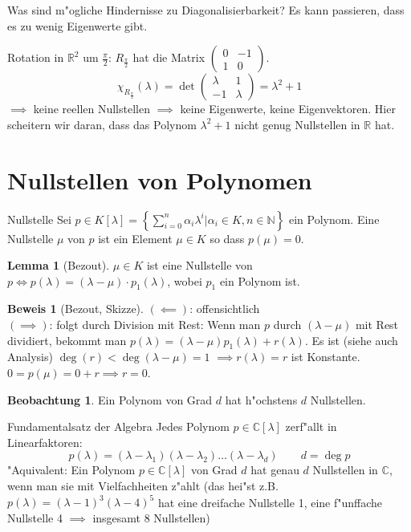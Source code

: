 \documentclass[oneside,fontsize=11pt,paper=a4,BCOR=0mm,DIV=12,automark,headsepline]{scrbook}
\newcommand{\gq}[1]{\glqq{}#1\grqq{}} %
\DeclareMathOperator{\mDeg}{deg}
\theoremstyle{remark}
\theoremstyle{definition}
\newtheorem{beobachtung}{Beobachtung}
\newtheorem{lemma}{Lemma}[section]
\theoremstyle{definition}
\newtheorem*{prof}{Beweis}
\theoremstyle{remark}
\begin{document}
Was sind m"ogliche Hindernisse zu Diagonalisierbarkeit?
Es kann passieren, dass es \gq{zu wenig} Eigenwerte gibt.
\begin{exa}[Rotation]
  Rotation in \(\mathbb{R}^2\) um \(\frac{\pi}{2}\): \(R_{\frac{\pi}{2}}\) hat die Matrix \(
  \begin{pmatrix}
    0 & -1 \\
    1 & 0
  \end{pmatrix}
  \).
  \[\chi_{R_{\frac{\pi}{2}}}(\lambda) = \det
    \begin{pmatrix}
      \lambda & 1\\
      -1 & \lambda
    \end{pmatrix}
    = \lambda^2 + 1
\] \(\implies\) keine reellen Nullstellen \(\implies\) keine Eigenwerte, keine Eigenvektoren. Hier scheitern wir daran, dass das Polynom \(\lambda^2+1\) nicht genug Nullstellen in \(\mathbb{R}\) hat.
\end{exa}

\section{Nullstellen von Polynomen}
\begin{definition}{Nullstelle}{}
  Sei \(p\in K[\lambda] = \left\{\sum_{i=0}^n\alpha_i\lambda^i|\alpha_i\in K, n\in\mathbb{N} \right\}\) ein Polynom. Eine Nullstelle \(\mu\) von \(p\) ist ein Element \(\mu\in K\) so dass \(p(\mu) = 0\).
\end{definition}
\begin{lemma}[Bezout]
  \(\mu\in K\) ist eine Nullstelle von \(p \iff p(\lambda) = (\lambda-\mu)\cdot p_1(\lambda)\), wobei \(p_1\) ein Polynom ist.
\end{lemma}
\begin{prof}[Bezout, Skizze]
  \((\impliedby)\): offensichtlich \\
  \((\implies)\): folgt durch Division mit Rest: Wenn man \(p\) durch \((\lambda-\mu)\) mit Rest dividiert, bekommt man \(p(\lambda) = (\lambda-\mu)p_1(\lambda) + r(\lambda)\). Es ist (siehe auch Analysis) \(\mDeg(r) < \mDeg(\lambda-\mu) = 1\) \(\implies r(\lambda)=r\) ist Konstante. \(0 = p(\mu) = 0 + r \implies r = 0\).
\end{prof}
\begin{beobachtung}
  Ein Polynom von Grad \(d\) hat h"ochstens \(d\) Nullstellen.
\end{beobachtung}
\begin{theo}{Fundamentalsatz der Algebra}
  Jedes Polynom \(p\in\mathbb{C}[\lambda]\) zerf"allt in Linearfaktoren:
  \[p(\lambda) = (\lambda - \lambda_1)(\lambda-\lambda_2)\dots(\lambda-\lambda_d) \qquad d = \mDeg p\]
  "Aquivalent: Ein Polynom \(p\in\mathbb{C}[\lambda]\) von Grad \(d\) hat genau \(d\) Nullstellen in \(\mathbb{C}\), wenn man sie mit Vielfachheiten z"ahlt (das hei"st z.B. \(p(\lambda) = (\lambda-1)^3(\lambda-4)^5\) hat eine dreifache Nullstelle 1, eine f"unffache Nullstelle 4 \(\implies\) insgesamt 8 Nullstellen)
\end{theo}
\end{document}
